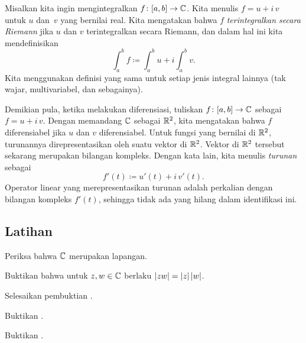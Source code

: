 Misalkan kita ingin mengintegralkan
$f \colon [a,b] \to {\mathbb{C}}$. Kita menulis
$f = u+i\,v$ untuk $u$ dan~$v$ yang bernilai real.
Kita mengatakan bahwa $f$ \emph{terintegralkan secara Riemann}
jika $u$ dan $v$ terintegralkan secara Riemann,
dan dalam hal ini kita mendefinisikan
\begin{equation*}
\int_a^b f \coloneqq \int_a^b u + i \int_a^b v .
\end{equation*}
Kita menggunakan definisi yang sama untuk setiap jenis integral lainnya (tak wajar,
multivariabel, dan sebagainya).

Demikian pula, ketika melakukan diferensiasi, tuliskan $f \colon [a,b] \to {\mathbb{C}}$ sebagai
$f = u+i\,v$. Dengan memandang ${\mathbb{C}}$ sebagai ${\mathbb{R}}^2$, kita mengatakan bahwa $f$ diferensiabel
jika $u$ dan $v$ diferensiabel. Untuk fungsi yang bernilai di ${\mathbb{R}}^2$, turunannya
direpresentasikan oleh suatu vektor di ${\mathbb{R}}^2$. Vektor di ${\mathbb{R}}^2$ tersebut sekarang merupakan bilangan
kompleks. Dengan kata lain,
kita menulis
\emph{turunan}
sebagai
\begin{equation*}
f'(t) \coloneqq u'(t) + i \, v'(t) .
\end{equation*}
Operator linear yang merepresentasikan turunan adalah perkalian dengan
bilangan kompleks $f'(t)$, sehingga tidak ada yang hilang dalam identifikasi ini.


\subsection{Latihan}

\begin{exercise}
Periksa bahwa ${\mathbb{C}}$ merupakan lapangan.
\end{exercise}

\begin{exercise}
Buktikan bahwa untuk $z,w \in {\mathbb{C}}$ berlaku
$\lvert {zw} \rvert = \lvert {z} \rvert \, \lvert {w} \rvert$.
\end{exercise}

\begin{exercise}
Selesaikan pembuktian .
\end{exercise}

\begin{exercise}
Buktikan .
\end{exercise}

\begin{exercise}
Buktikan .
\end{exercise}

